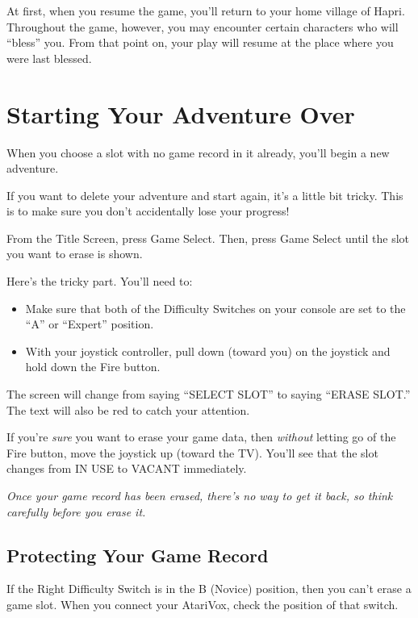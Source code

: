 \documentclass[10pt,twoside,openright]{memoir}
\begin{document}
At first, when you resume the game, you'll return to your home village
of Hapri. Throughout the game, however, you may encounter certain
characters who will ``bless'' you. From that point on, your play will
resume at the place where you were last blessed.

\section{Starting Your Adventure Over}\label{Starting Your Adventure Over}

When you choose a slot with no game record in it already, you'll begin
a new adventure.

If you want to delete your adventure  and start again, it's a little bit
tricky. This is to make sure you don't accidentally lose your progress!

From the Title Screen, press Game  Select. Then, press Game Select until
the slot you want to erase is shown.

Here's the tricky part. You'll need to:

\begin{itemize}
\item Make sure that both of the Difficulty Switches on your console
  are set to the ``A'' or ``Expert'' position.
\item With your joystick controller, pull down (toward you) on the
  joystick and hold down the Fire button.
\end{itemize}

The screen will change from saying ``SELECT SLOT'' to saying ``ERASE
SLOT.'' The text will also be red to catch your attention.

If  you're  \emph{sure}   you  want  to  erase  your   game  data,  then
\emph{without}  letting go  of the  Fire  button, move  the joystick  up
(toward  the TV).  You'll  see that  the  slot changes  from  IN USE  to
VACANT immediately.

\emph{Once your  game record has been  erased, there's no way  to get it
  back, so think carefully before you erase it.}

\subsection{Protecting Your Game Record}

If the Right  Difficulty Switch is in the B  (Novice) position, then you
can't  erase a  game slot.  When you  connect your  AtariVox, check  the
position of that switch.
\end{document}
